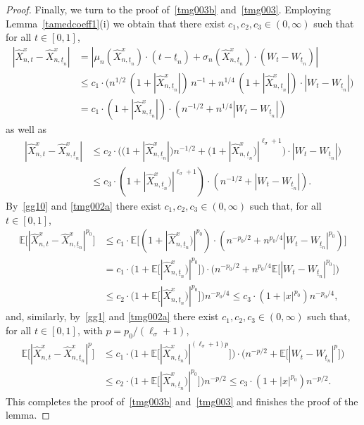 \documentclass[11pt]{amsart}
\newcommand{\EE}{{\mathbb E}}
\newcommand{\utn}{\underline {t}_n}
\theoremstyle{plain}
\theoremstyle{definition}
\begin{document}
\begin{proof}
Finally, we turn to the proof of~\eqref{tmg003b} and~\eqref{tmg003}.
 Employing Lemma~\ref{tamedcoeff1}(i) we obtain that there exist $c_1, c_2, c_3\in(0, \infty)$  such that for all $t\in[0,1]$,
\begin{equation}\label{gg10}
	\begin{aligned}
		|\widehat{X}^x_{n,t} -\widehat{X}^x_{n,\utn}| & = |\mu_n(\widehat{X}^x_{n,\utn})\cdot (t-\utn) + \sigma_n(\widehat{X}^x_{n,\utn})\cdot (W_t-W_{\utn})   | \\
		& \le c_1\cdot\bigl(n^{1/2}\,(1+|\widehat{X}^x_{n,\utn}|)\,n^{-1}  + n^{1/4}\,(1+| \widehat{X}^x_{n,\utn}|)\cdot |W_t-W_{\utn}   | \bigr)\\
		& = c_1\cdot (1+|\widehat{X}^x_{n,\utn}|)\cdot ( n^{-1/2} + n^{1/4}|W_t-W_{\utn}   |  )
	\end{aligned}
\end{equation}
as well as
\begin{equation}\label{gg1}
	\begin{aligned}
		|\widehat{X}^x_{n,t} -\widehat{X}^x_{n,\utn}| &  \le c_2\cdot\bigl(\bigl(1+|\widehat{X}^x_{n,\utn}|\bigr)n^{-1/2}  + \bigl(1+| \widehat{X}^x_{n,\utn})  |^{\ell_\sigma +1}\bigr)\cdot |W_t-W_{\utn}   | \bigr)\\
		& \le c_3\cdot  (1+|\widehat{X}^x_{n,\utn})|^{\ell_\sigma +1}) \cdot ( n^{-1/2} + |W_t-W_{\utn}   | ).
	\end{aligned}
\end{equation}
By~\eqref{gg10} and
\eqref{tmg002a}
there exist $c_1, c_2, c_3\in(0, \infty)$  such that, for all $t\in[0,1]$,
\begin{equation}\label{gg20}
	\begin{aligned}
		\EE\bigl[ 	|\widehat{X}^x_{n,t} -\widehat{X}^x_{n,\utn}|^{p_0}\bigr]
		& \le c_1\cdot \EE\bigl[ (1+|\widehat{X}^x_{n,\utn})|^{p_0})\cdot  ( n^{-p_0/2} + n^{p_0/4}|W_t-W_{\utn}   |^{p_0}  )\bigr] \\
		& = c_1\cdot  \bigl(1+\EE\bigl[ |\widehat{X}^x_{n,\utn})|^{p_0}\bigr]\bigr) \cdot\bigl( n^{-p_0/2} +n^{p_0/4} \EE\bigl[ |W_t-W_{\utn}   |^{p_0}  \bigr]\bigr) \\
		& \le c_2\cdot  \bigl(1+\EE\bigl[ |\widehat{X}^x_{n,\utn})|^{p_0}\bigr]\bigr) n^{-p_0/4} \le c_3\cdot (1+|x|^{p_0})n^{-p_0/4},
	\end{aligned}
\end{equation}
and, similarly, by~\eqref{gg1} and
\eqref{tmg002a}
  there exist $c_1, c_2, c_3\in(0, \infty)$  such that, for all $t\in[0,1]$, with $p=p_0/(\ell_\sigma +1)$,
\begin{equation}\label{gg2}
	\begin{aligned}
\EE\bigl[ 	|\widehat{X}^x_{n,t} -\widehat{X}^x_{n,\utn}|^p\bigr]
& \le c_1\cdot  \bigl(1+\EE\bigl[ |\widehat{X}^x_{n,\utn})|^{(\ell_\sigma +1)p}\bigr]\bigr) \cdot\bigl( n^{-p/2} + \EE\bigl[ |W_t-W_{\utn}   |^p  \bigr]\bigr) \\
& \le c_2\cdot \bigl(1+\EE\bigl[ |\widehat{X}^x_{n,\utn})|^{p_0}\bigr]\bigr) n^{-p/2} \le c_3\cdot (1+|x|^{p_0})n^{-p/2}.
	\end{aligned}
\end{equation}
 This completes the proof of~\eqref{tmg003b} and~\eqref{tmg003} and finishes the proof of the lemma.


\end{proof}
\end{document}
